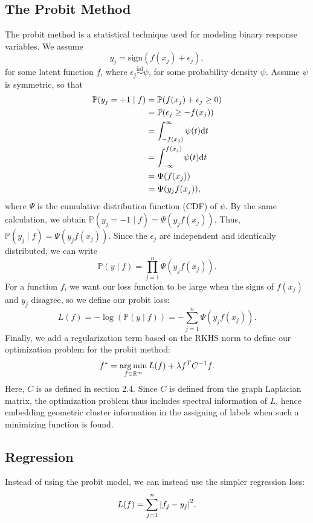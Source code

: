 \documentclass[12pt]{amsart}
\newcommand{\iid}{\overset{\mathrm{iid}}{\sim}}
\begin{document}
\subsection{The Probit Method}\label{Sec:Probit}
The probit method is a statistical technique used for modeling binary response variables. We assume
\[y_j = \mathrm{sign}(f(x_j) + \epsilon_j),\]
for some latent function $f$, where $\epsilon_j\iid \psi$, for some probability density $\psi$. Assume $\psi$ is symmetric, so that
\begin{align*}
	\mathbb{P}(y_j = +1 \mid f) &= \mathbb{P}(f(x_j) + \epsilon_j \geq 0) \\
	&= \mathbb{P}(\epsilon_j \geq - f(x_j)  ) \\
	&= \int_{-f(x_j)}^\infty \psi(t) {\mathrm{d}} t \\
	&= \int_{-\infty}^{f(x_j)} \psi(t) {\mathrm{d}} t \\
	&= \Psi(f(x_j)) \\
	&= \Psi(y_jf(x_j)),
\end{align*}
where $\Psi$ is the cumulative distribution function (CDF) of $\psi$. By the same calculation, we obtain $\mathbb{P}(y_j = -1 \mid f) = \Psi(y_jf(x_j))$. Thus, $\mathbb{P}(y_j \mid f) = \Psi(y_jf(x_j))$. Since the $\epsilon_j$ are independent and identically distributed, we can write
\[\mathbb{P}(y  \mid f) = \prod_{j = 1}^n \Psi(y_jf(x_j)).\]
For a function $f$, we want our loss function to be large when the signs of $f(x_j)$ and $y_j$  disagree, so we define our probit loss:
\[L(f) = -\log(\mathbb{P}(y\mid f)) = -\sum_{j = 1}^n \Psi(y_jf(x_j)).\]
Finally, we add a regularization term based on the RKHS norm to define our optimization problem for the probit method:
\[f^* = \operatorname*{arg\,min}_{f \in \mathbb{R}^{m}} L(f) + \lambda f^{T}C^{-1}f.\]
Here, $C$ is as defined in section 2.4. Since $C$ is defined from the graph Laplacian matrix, the optimization problem thus includes spectral information of $L$, hence embedding geometric cluster information in the assigning of labels when such a minimizing function is found.

\subsection{Regression}
Instead of using the probit model, we can instead use the simpler regression loss:
\[L(f) = \sum_{j = 1}^n {\left|f_j - y_j\right|}^2.\]
\end{document}
